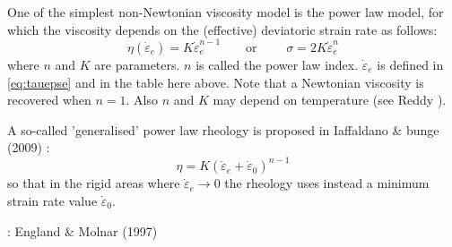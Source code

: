 

One of the simplest non-Newtonian viscosity model is the power law model, 
for which the viscosity depends on the (effective) deviatoric strain rate as follows:
\begin{equation}
\eta(\dot{\varepsilon}_e) = K \dot{\varepsilon}_{e}^{n-1}
\qquad \text{or } \qquad
\sigma = 2 K \dot{\varepsilon}_e ^n 
\end{equation}
where $n$ and $K$ are parameters. $n$ is called the power law index. $\dot{\varepsilon}_e$ 
is defined in  \eqref{eq:tauepse} and in the table here above. 
Note that a Newtonian viscosity is recovered when $n=1$. Also $n$ and $K$ may depend on temperature
(see Reddy  \cite[p339]{reddybook2}).

A so-called 'generalised' power law rheology is proposed in Iaffaldano \& bunge (2009) \cite{iabu09}:
\begin{equation}
\eta = K (\dot{\varepsilon}_{e}+\dot{\varepsilon}_0)^{n-1}
\end{equation}
so that in the rigid areas where $\dot{\varepsilon}_e \rightarrow 0$ the rheology 
uses instead a minimum strain rate value $\dot{\varepsilon}_0$.

\Literature: England \& Molnar (1997) \cite{enmo97}
